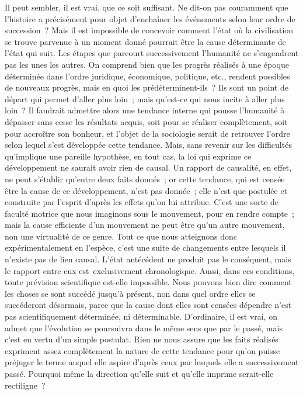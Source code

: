 \documentclass[french,twoside]{book} %
\begin{document}
Il peut sembler, il est vrai, que ce soit suffisant. Ne dit-on pas couramment que l’histoire a précisément pour objet d’enchaîner les événements selon leur ordre de succession ? Mais il est impossible de concevoir comment l’état où la civilisation se trouve parvenue à un moment donné pourrait être la cause déterminante de l’état qui suit. Les étapes que parcourt successivement l’humanité ne s’engendrent pas les unes les autres. On comprend bien que les progrès réalisés à une époque déterminée dans l’ordre juridique, économique, politique, etc., rendent possibles de nouveaux progrès, mais en quoi les prédéterminent-ils ? Ils sont un point de départ qui permet d’aller plus loin ; mais qu’est-ce qui nous incite à aller plus loin ? Il faudrait admettre alors une tendance interne qui pousse l’humanité à dépasser sans cesse les résultats acquis, soit pour se réaliser complètement, soit pour accroître son bonheur, et l’objet de la sociologie serait de retrouver l’ordre selon lequel s’est développée cette tendance. Mais, sans revenir sur les difficultés qu’implique une pareille hypothèse, en tout cas, la loi qui exprime ce développement ne saurait avoir rien de causal. Un rapport de causalité, en effet, ne peut s’établir qu’entre deux faits donnés ; or cette tendance, qui est censée être la cause de ce développement, n’est pas donnée ; elle n’est que postulée et construite par l’esprit d’après les effets qu’on lui attribue. C’est une sorte de faculté motrice que nous imaginons sous le mouvement, pour en rendre compte ; mais la cause efficiente d’un mouvement ne peut être qu’un autre mouvement, non une virtualité de ce genre. Tout ce que nous atteignons donc expérimentalement en l’espèce, c’est une suite de changements entre lesquels il n’existe pas de lien causal. L’état antécédent ne produit pas le conséquent, mais le rapport entre eux est exclusivement chronologique. Aussi, dans ces conditions, toute prévision scientifique est-elle impossible. Nous pouvons bien dire comment les choses se sont succédé jusqu’à présent, non dans quel ordre elles se succéderont désormais, parce que la cause dont elles sont censées dépendre n’est pas scientifiquement déterminée, ni déterminable. D’ordinaire, il est vrai, on admet que l’évolution se poursuivra dans le même sens que par le passé, mais c’est en vertu d’un simple postulat. Rien ne nous assure que les faits réalisés expriment assez complètement la nature de cette tendance pour qu’on puisse préjuger le terme auquel elle aspire d’après ceux par lesquels elle a successivement passé. Pourquoi même la direction qu’elle suit et qu’elle imprime serait-elle rectiligne ?\par
\end{document}
